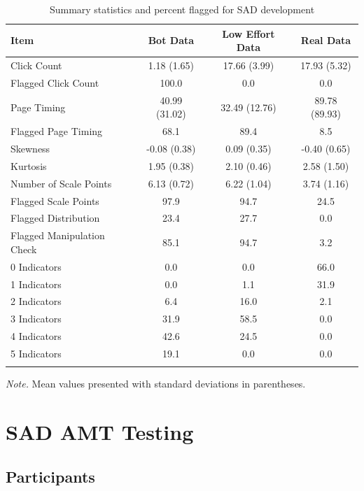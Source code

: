 \documentclass[english,man]{apa6}
\theoremstyle{definition}
\theoremstyle{definition}
\theoremstyle{definition}
\theoremstyle{remark}
\begin{document}
\begin{table}[tbp]
\begin{center}
\begin{threeparttable}
\caption{\label{tab:sad-table1}Summary statistics and percent flagged for SAD development}
\begin{tabular}{lccc}
\toprule
Item & \multicolumn{1}{c}{Bot Data} & \multicolumn{1}{c}{Low Effort Data} & \multicolumn{1}{c}{Real Data}\\
\midrule
Click Count & 1.18 (1.65) & 17.66 (3.99) & 17.93 (5.32)\\
Flagged Click Count & 100.0 & 0.0 & 0.0\\
Page Timing & 40.99 (31.02) & 32.49 (12.76) & 89.78 (89.93)\\
Flagged Page Timing & 68.1 & 89.4 & 8.5\\
Skewness & -0.08 (0.38) & 0.09 (0.35) & -0.40 (0.65)\\
Kurtosis & 1.95 (0.38) & 2.10 (0.46) & 2.58 (1.50)\\
Number of Scale Points & 6.13 (0.72) & 6.22 (1.04) & 3.74 (1.16)\\
Flagged Scale Points & 97.9 & 94.7 & 24.5\\
Flagged Distribution & 23.4 & 27.7 & 0.0\\
Flagged Manipulation Check & 85.1 & 94.7 & 3.2\\
0 Indicators & 0.0 & 0.0 & 66.0\\
1 Indicators & 0.0 & 1.1 & 31.9\\
2 Indicators & 6.4 & 16.0 & 2.1\\
3 Indicators & 31.9 & 58.5 & 0.0\\
4 Indicators & 42.6 & 24.5 & 0.0\\
5 Indicators & 19.1 & 0.0 & 0.0\\
\bottomrule
\addlinespace
\end{tabular}
\begin{tablenotes}[para]
\textit{Note.} Mean values presented with standard deviations in parentheses.
\end{tablenotes}
\end{threeparttable}
\end{center}
\end{table}

\section{SAD AMT Testing}\label{sad-amt-testing}

\subsection{Participants}\label{participants-1}
\end{document}
